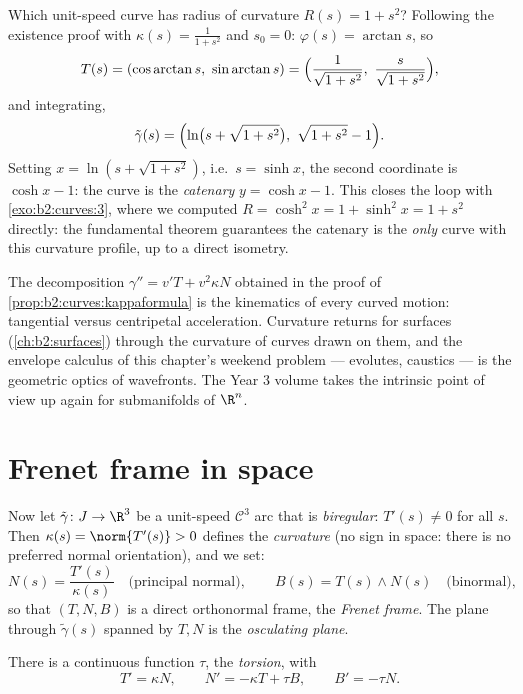 \begin{example}\label{ex:b2:curves:reconstruction}
Which unit-speed curve has radius of curvature $R(s) = 1 +
s^2$? Following the existence proof with $\kappa(s) =
\frac1{1+s^2}$ and $s_0 = 0$: $\varphi(s) = \arctan s$, so
\[
T(s) = (\cos\arctan s,\ \sin\arctan s)
= \Bigl(\frac{1}{\sqrt{1+s^2}},\
\frac{s}{\sqrt{1+s^2}}\Bigr),
\]
and integrating,
\[
\tilde\gamma(s) = \Bigl(\ln\bigl(s + \sqrt{1 + s^2}\bigr),\
\sqrt{1 + s^2} - 1\Bigr).
\]
Setting $x = \ln(s + \sqrt{1+s^2})$, i.e.\ $s = \sinh x$, the
second coordinate is $\cosh x - 1$: the curve is the
\emph{catenary} $y = \cosh x - 1$. This closes the loop with
\cref{exo:b2:curves:3}, where we computed $R = \cosh^2 x = 1 +
\sinh^2 x = 1 + s^2$ directly: the fundamental theorem
guarantees the catenary is the \emph{only} curve with this
curvature profile, up to a direct isometry.
\end{example}

\begin{remark}
The decomposition $\gamma'' = v'T + v^2\kappa N$ obtained in
the proof of \cref{prop:b2:curves:kappaformula} is the
kinematics of every curved motion: tangential versus
centripetal acceleration. Curvature returns for surfaces
(\cref{ch:b2:surfaces}) through the curvature of curves drawn
on them, and the envelope calculus of this chapter's weekend
problem --- evolutes, caustics --- is the geometric optics of
wavefronts. The Year 3 volume takes the intrinsic point of
view up again for submanifolds of $\R^n$.
\end{remark}

\section{Frenet frame in space}

Now let $\tilde\gamma \colon J \to \R^3$ be a unit-speed
$\mathcal{C}^3$ arc that is \emph{biregular}: $T'(s) \neq 0$ for
all $s$. Then $\kappa(s) = \norm{T'(s)} > 0$ defines the
\emph{curvature} (no sign in space: there is no preferred normal
orientation), and we set:
\[
N(s) = \frac{T'(s)}{\kappa(s)}
\quad\text{(principal normal)},
\qquad
B(s) = T(s) \wedge N(s)
\quad\text{(binormal)} ,
\]
so that $(T, N, B)$ is a direct orthonormal frame, the
\emph{Frenet frame}. The plane through $\tilde\gamma(s)$ spanned by
$T, N$ is the \emph{osculating plane}.

\begin{theorem}\label{thm:b2:curves:frenet3d}
There is a continuous function $\tau$, the \emph{torsion}, with
\[
T' = \kappa N, \qquad
N' = -\kappa T + \tau B, \qquad
B' = -\tau N .
\]
\end{theorem}

